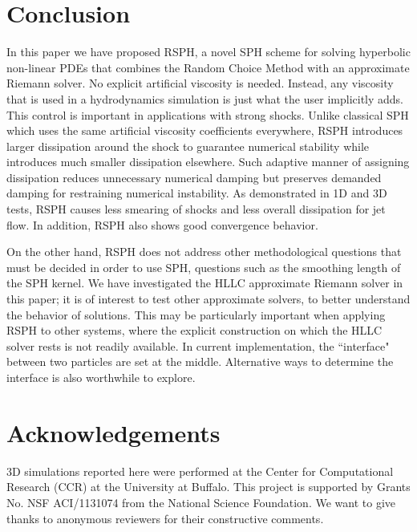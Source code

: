 \documentclass[preprint,12pt,authoryear]{elsarticle}
\begin{document}
\section{Conclusion} \label{discussion}
In this paper we have proposed RSPH, a novel SPH scheme for solving hyperbolic non-linear PDEs that combines the Random Choice Method with an approximate Riemann solver. No explicit artificial viscosity is needed. Instead, any viscosity that is used in a hydrodynamics simulation is just what the user implicitly adds. 
This control is important in applications with strong shocks. 
Unlike classical SPH which uses the same artificial viscosity coefficients everywhere, RSPH introduces larger dissipation around the shock to guarantee numerical stability while introduces much smaller dissipation elsewhere. Such adaptive manner of assigning dissipation reduces unnecessary numerical damping but preserves demanded damping for restraining numerical instability. As demonstrated in 1D and 3D tests, RSPH causes less smearing of shocks and less overall dissipation for jet flow.
In addition, RSPH also shows good convergence behavior.

On the other hand, RSPH does not address other methodological questions that must be decided in order to use SPH, questions such as the smoothing length of the SPH kernel. We have investigated the HLLC approximate Riemann solver in this paper; it is of interest to test other approximate solvers, to better understand the behavior of solutions. This may be particularly important when applying RSPH to other systems, where the explicit construction on which the HLLC solver rests is not readily available. In current implementation, the ``interface" between two particles are set at the middle. Alternative ways to determine the interface is also worthwhile to explore. 

\section*{Acknowledgements}
3D simulations reported here were performed at the Center for Computational Research (CCR) at the University at Buffalo. This project is supported by Grants No. NSF ACI/1131074 from the National Science Foundation. We want to give thanks to anonymous reviewers for their constructive comments.

\appendix
\end{document}
